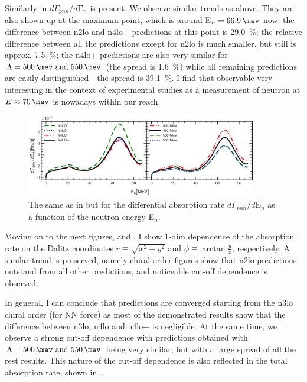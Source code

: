     Similarly in  $d\Gamma_{pnn} /d\text{E}_n$ is present. We observe similar trends as above.
    They are also shown up at the maximum point, which is around E$_n = \SI{66.9}{\mev}$ now:
    the difference between \gls{n2lo} and \gls{n4lo+} predictions at this point is \SI{29.0}{\percent};
    the relative difference between all the predictions except for \gls{n2lo}
    is much smaller, but still is approx. \SI{7.5}{\percent};
    the \gls{n4lo+} predictions are also very similar for $\Lambda=\SIlist{500;550}{\mev}$ (the spread is \SI{1.6}{\percent})
    while all remaining predictions are easily distinguished - the spread is \SI{39.1}{\percent}.
    I find that observable very interesting in the context of experimental studies as a measurement of neutron at
    $E\eqsim\SI{70}{\mev}$ is nowadays within our reach. 


    \begin{figure}[h]
        \begin{center}
        \includegraphics[width=0.9\textwidth]{PlotData/PION/Dalitz_maps/figures/3HE_dGdEn.pdf}
        \end{center}
        \caption{The same as in  but for the differential absorption rate $d\Gamma_{pnn} /d\text{E}_n$
        as a function of the neutron energy E$_n$.}
        \label{pion_dGdEn}
    \end{figure}

    Moving on to the next figures,  and , I show 1-dim dependence of the
    absorption rate on the Dalitz coordinates $r \equiv \sqrt{x^2 + y^2}$  and $\phi \equiv \arctan \frac{y}{x}$, respectively.
    A similar trend is preserved, namely chiral order figures show that \gls{n2lo} predictions
    outstand from all other predictions, and noticeable cut-off dependence is observed.

    In general, I can conclude that predictions are converged starting from the \gls{n3lo} chiral order (for NN force) as
    most of the demonstrated results show that the difference between \gls{n3lo}, \gls{n4lo} and 
    \gls{n4lo+} is negligible. At the same time, we observe a strong cut-off dependence with
    predictions obtained with $\Lambda=\SIlist{500;550}{\mev}$ being very similar,
    but with a large spread of all the rest results.
    This nature of the cut-off dependence is also reflected in the total absorption 
    rate, shown in . 

